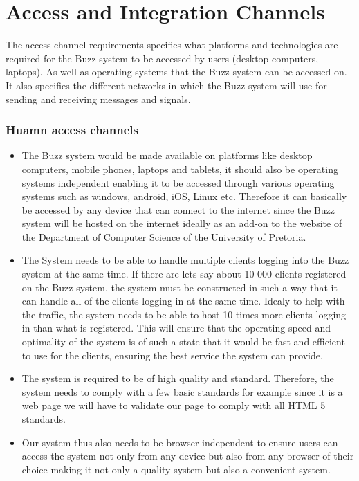 \documentclass[a4paper]{article}
\begin{document}
\section{Access and Integration Channels}
The access channel requirements specifies what platforms and technologies are required for the Buzz system to be accessed by users (desktop computers, laptops). As well as operating systems that the Buzz system can be accessed on. It also specifies the different networks in which the Buzz system will use for sending and receiving messages and signals.

\subsubsection{Huamn access channels }
\begin{itemize}
\item The Buzz system would be made available on platforms like desktop computers, mobile phones, laptops and tablets, it should also be operating systems independent enabling it to be accessed through various operating systems such as  windows, android, iOS, Linux etc. Therefore it can basically be accessed by any device that can connect to the internet since the Buzz system will be hosted on the internet ideally as an add-on to the website of the Department of Computer Science of the University of Pretoria. 
\item The System needs to be able to handle multiple clients logging into the Buzz system at the same time. If there are lets say about 10 000 clients registered on the Buzz system, the system must be constructed in such a way that it can handle all of the clients logging in at the same time. Idealy to help with the traffic, the system needs to be able to host 10 times more clients logging in than what is registered. This will ensure that the operating speed and optimality of the system is of such a state that it would be fast and efficient to use for the clients, ensuring the best service the system can provide.
\item The system is required to be of high quality and standard. Therefore, the system needs to comply with a few basic standards for example  since it is a web page we will have to validate our page to comply with all HTML 5 standards. 
\item Our system thus also needs to be browser independent to ensure users can access the system not only from any device but also from any browser of their choice making it not only a quality system but also a convenient system.


\end{itemize}
\end{document}
